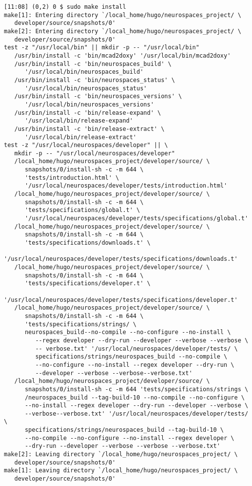 \documentclass[12pt]{article}
\begin{document}
\begin{itemize}
\begin{enumerate}
\begin{verbatim}
[11:08] (0,2) 0 $ sudo make install
make[1]: Entering directory `/local_home/hugo/neurospaces_project/ \
   developer/source/snapshots/0'
make[2]: Entering directory `/local_home/hugo/neurospaces_project/ \
   developer/source/snapshots/0'
test -z "/usr/local/bin" || mkdir -p -- "/usr/local/bin"
   /usr/bin/install -c 'bin/mcad2doxy' '/usr/local/bin/mcad2doxy'
   /usr/bin/install -c 'bin/neurospaces_build' \
      '/usr/local/bin/neurospaces_build'
   /usr/bin/install -c 'bin/neurospaces_status' \
      '/usr/local/bin/neurospaces_status'
   /usr/bin/install -c 'bin/neurospaces_versions' \
      '/usr/local/bin/neurospaces_versions'
   /usr/bin/install -c 'bin/release-expand' \
      '/usr/local/bin/release-expand'
   /usr/bin/install -c 'bin/release-extract' \
      '/usr/local/bin/release-extract'
test -z "/usr/local/neurospaces/developer" || \
   mkdir -p -- "/usr/local/neurospaces/developer"
   /local_home/hugo/neurospaces_project/developer/source/ \
      snapshots/0/install-sh -c -m 644 \
      'tests/introduction.html' \
      '/usr/local/neurospaces/developer/tests/introduction.html'
   /local_home/hugo/neurospaces_project/developer/source/ \
      snapshots/0/install-sh -c -m 644 \
      'tests/specifications/global.t' \
      '/usr/local/neurospaces/developer/tests/specifications/global.t'
   /local_home/hugo/neurospaces_project/developer/source/ \
      snapshots/0/install-sh -c -m 644 \
      'tests/specifications/downloads.t' \
      '/usr/local/neurospaces/developer/tests/specifications/downloads.t'
   /local_home/hugo/neurospaces_project/developer/source/ \
      snapshots/0/install-sh -c -m 644 \
      'tests/specifications/developer.t' \
      '/usr/local/neurospaces/developer/tests/specifications/developer.t'
   /local_home/hugo/neurospaces_project/developer/source/ \
      snapshots/0/install-sh -c -m 644 \
      'tests/specifications/strings/ \
      neurospaces_build--no-compile --no-configure --no-install \
         --regex developer --dry-run --developer --verbose --verbose \
         -- verbose.txt' '/usr/local/neurospaces/developer/tests/ \
         specifications/strings/neurospaces_build --no-compile \
         --no-configure --no-install --regex developer --dry-run \
         --developer --verbose --verbose--verbose.txt'
   /local_home/hugo/neurospaces_project/developer/source/ \
      snapshots/0/install-sh -c -m 644 'tests/specifications/strings \
      /neurospaces_build --tag-build-10 --no-compile --no-configure \
      --no-install --regex developer --dry-run --developer --verbose \
      --verbose--verbose.txt' '/usr/local/neurospaces/developer/tests/ \
      specifications/strings/neurospaces_build --tag-build-10 \
      --no-compile --no-configure --no-install --regex developer \
      --dry-run --developer --verbose --verbose --verbose.txt'
make[2]: Leaving directory `/local_home/hugo/neurospaces_project/ \
   developer/source/snapshots/0'
make[1]: Leaving directory `/local_home/hugo/neurospaces_project/ \
   developer/source/snapshots/0'


\end{verbatim}
\end{enumerate}
\end{itemize}
\end{document}
